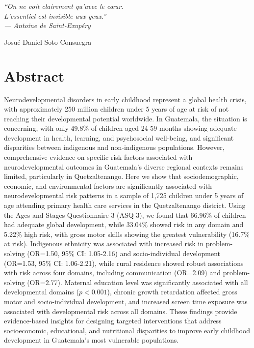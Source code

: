 \documentclass[11pt,letterpaper]{report}
\begin{document}
\vspace{1cm}

\begin{center}
\textit{``On ne voit clairement qu'avec le cœur. \\
L'essentiel est invisible aux yeux.''} \\
\textit{--- Antoine de Saint-Exupéry}
\end{center}


\begin{flushright}
Josué Daniel Soto Consuegra
\end{flushright}


\chapter*{Abstract}

Neurodevelopmental disorders in early childhood represent a global health 
crisis, with approximately 250 million children under 5 years of age at risk 
of not reaching their developmental potential worldwide. In Guatemala, the 
situation is concerning, with only 49.8\% of children aged 24-59 months 
showing adequate development in health, learning, and psychosocial well-being, 
and significant disparities between indigenous and non-indigenous populations. 
However, comprehensive evidence on specific risk factors associated with 
neurodevelopmental outcomes in Guatemala's diverse regional contexts remains 
limited, particularly in Quetzaltenango. Here we show that sociodemographic, 
economic, and environmental factors are significantly associated with 
neurodevelopmental risk patterns in a sample of 1,725 children under 5 years 
of age attending primary health care services in the Quetzaltenango district. 
Using the Ages and Stages Questionnaire-3 (ASQ-3), we found that 66.96\% of 
children had adequate global development, while 33.04\% showed risk in any 
domain and 5.22\% high risk, with gross motor skills showing the greatest 
vulnerability (16.7\% at risk). Indigenous ethnicity was associated with 
increased risk in problem-solving (OR=1.50, 95\% CI: 1.05-2.16) and 
socio-individual development (OR=1.53, 95\% CI: 1.06-2.21), while rural 
residence showed robust associations with risk across four domains, including 
communication (OR=2.09) and problem-solving (OR=2.77). Maternal education 
level was significantly associated with all developmental domains ($p<0.001$), 
chronic growth retardation affected gross motor and socio-individual 
development, and increased screen time exposure was associated with 
developmental risk across all domains. These findings provide evidence-based 
insights for designing targeted interventions that address socioeconomic, 
educational, and nutritional disparities to improve early childhood 
development in Guatemala's most vulnerable populations.
\end{document}
